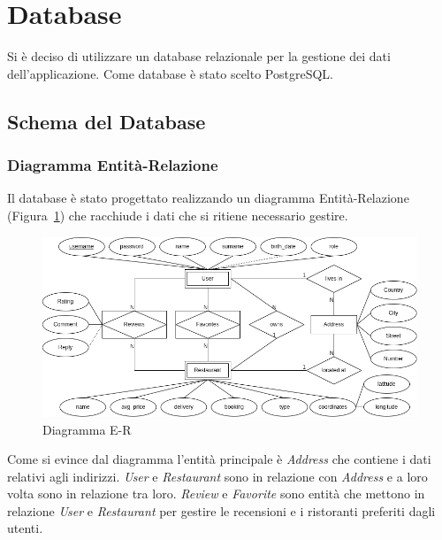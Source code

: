 \section{Database}
Si è deciso di utilizzare un database relazionale per 
la gestione dei dati dell'applicazione.
Come database è stato scelto PostgreSQL.

\subsection{Schema del Database}
\subsubsection{Diagramma Entità-Relazione}
Il database è stato progettato realizzando un 
diagramma Entità-Relazione (Figura~\ref{fig:er-diagram}) che racchiude i dati che si ritiene 
necessario gestire.
\begin{figure}[H]
  \centering
  \includegraphics[width=\textwidth]{images/ER-base.png}
  \caption{Diagramma E-R}
  \label{fig:er-diagram}
\end{figure}
Come si evince dal diagramma l'entità principale 
è \textit{Address} che contiene i dati relativi agli indirizzi. 
\textit{User} e \textit{Restaurant} sono in relazione con \textit{Address} 
e a loro volta sono in relazione tra loro.
\textit{Review} e \textit{Favorite} sono entità che mettono in 
relazione  
\textit{User} e \textit{Restaurant} per gestire le recensioni
e i ristoranti preferiti dagli utenti.
